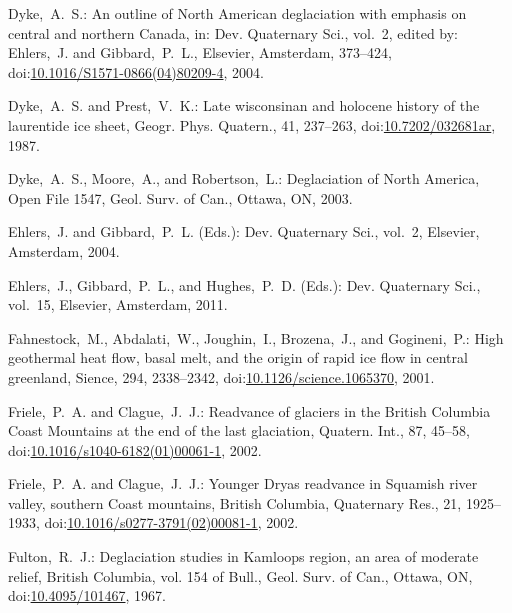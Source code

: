 \documentclass[tc, manuscript]{copernicus}
\begin{document}
\begin{thebibliography}{114}
Dyke,~A.~S.: An outline of North American deglaciation with emphasis
on central and northern Canada, in: Dev. Quaternary Sci., vol.~2,
edited by: Ehlers,~J. and Gibbard,~P.~L., Elsevier, Amsterdam, 373--424,
doi:\href{http://dx.doi.org/10.1016/S1571-0866(04)80209-4}{10.1016/S1571-0866(04)80209-4}, 2004.


Dyke,~A.~S. and Prest,~V.~K.: Late wisconsinan and holocene history of the laurentide ice sheet, G{e}ogr. Phys. Quatern., 41, 237--263,
doi:\href{http://dx.doi.org/10.7202/032681ar}{10.7202/032681ar}, 1987.


Dyke,~A.~S., Moore,~A., and Robertson,~L.: Deglaciation of North America, Open File 1547, Geol. Surv. of Can., Ottawa, ON, 2003.


Ehlers,~J. and Gibbard,~P.~L. (Eds.): Dev. Quaternary Sci., vol.~2, Elsevier, Amsterdam, 2004.


Ehlers,~J., Gibbard,~P.~L., and Hughes,~P.~D. (Eds.):  Dev. Quaternary
Sci., vol.~15, Elsevier, Amsterdam, 2011.


Fahnestock,~M., Abdalati,~W., Joughin,~I., Brozena,~J., and Gogineni,~P.: High geothermal heat flow, basal melt, and the origin of rapid ice flow in central greenland, Sience, 294, 2338--2342,
doi:\href{http://dx.doi.org/10.1126/science.1065370}{10.1126/science.1065370}, 2001.


Friele,~P.~A. and Clague,~J.~J.: Readvance of glaciers in the British Columbia Coast Mountains at the end of the last glaciation, Quatern. Int., 87, 45--58,
doi:\href{http://dx.doi.org/10.1016/s1040-6182(01)00061-1}{10.1016/s1040-6182(01)00061-1}, 2002{}.


Friele,~P.~A. and Clague,~J.~J.: Younger Dryas readvance in Squamish river valley, southern Coast mountains, British Columbia, Quaternary Res., 21, 1925--1933,
doi:\href{http://dx.doi.org/10.1016/s0277-3791(02)00081-1}{10.1016/s0277-3791(02)00081-1}, 2002{}.


Fulton,~R.~J.: Deglaciation studies in Kamloops region, an area of moderate relief, British Columbia, vol. 154 of Bull., Geol. Surv. of Can., Ottawa, ON,
doi:\href{http://dx.doi.org/10.4095/101467}{10.4095/101467}, 1967.



\end{thebibliography}
\end{document}
